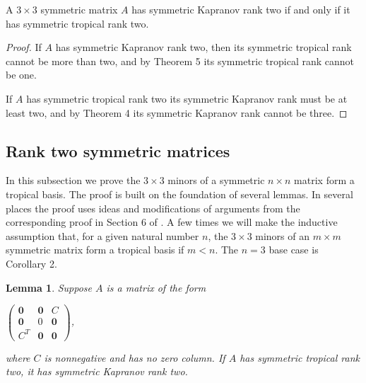 \documentclass{article}
\begin{document}
\begin{cor}
  A $3 \times 3$ symmetric matrix $A$ has symmetric Kapranov rank two if and only if it has symmetric tropical rank two.
\end{cor}

\begin{proof}
  If $A$ has symmetric Kapranov rank two, then its symmetric tropical rank cannot be more than two, and by Theorem 5 its symmetric tropical rank cannot be one.
  
  If $A$ has symmetric tropical rank two its symmetric Kapranov rank must be at least two, and by Theorem 4 its symmetric Kapranov rank cannot be three.
\end{proof}

\subsection{Rank two symmetric matrices}

In this subsection we prove the $3 \times 3$ minors of a symmetric $n \times n$ matrix form a tropical basis. The proof is built on the foundation of several lemmas. In several places the proof uses ideas and modifications of arguments from the corresponding proof in Section 6 of \cite{dss}. A few times we will make the inductive assumption that, for a given natural number $n$, the $3 \times 3$ minors of an $m \times m$ symmetric matrix form a tropical basis if $m < n$. The $n = 3$ base case is Corollary 2. 

\newtheorem{lem}{Lemma}
\begin{lem}
  Suppose $A$ is a matrix of the form
  \begin{center}      
    $\left(\begin{array}{ccc} \textbf{0} & \textbf{0} & C \\ \textbf{0} & 0 & \textbf{0} \\ C^{T} & \textbf{0} & \textbf{0} \end{array}\right)$,
  \end{center}   
  where $C$ is nonnegative and has no zero column. If $A$ has symmetric tropical rank two, it has symmetric Kapranov rank two.
\end{lem}
\end{document}
